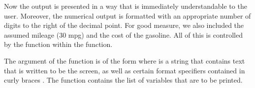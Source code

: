 \documentclass[letterpaper,10pt,english]{sphinxmanual}
\begin{document}
\sphinxAtStartPar
Now the output is presented in a way that is immediately understandable to the user.  Moreover, the numerical output is formatted with an appropriate number of digits to the right of the decimal point.  For good measure, we also included the assumed mileage (30 mpg) and the cost of the gasoline.  All of this is controlled by the  function within the  function.

\sphinxAtStartPar
The argument of the  function is of the form  where   is a string that contains text that is written to be the screen, as well as certain format specifiers contained in curly braces \sphinxcode{\sphinxupquote{\{\}}}.  The  function contains the list of variables that are to be printed.
\end{document}
